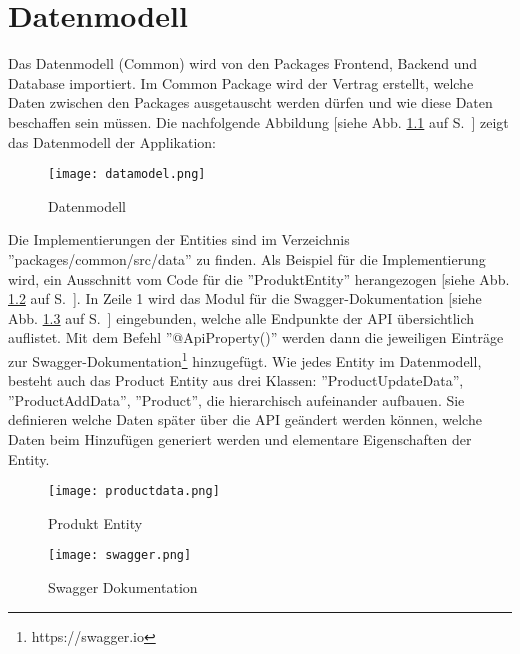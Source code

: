 \chapter{Datenmodell}
Das Datenmodell (Common) wird von den Packages Frontend, Backend und Database importiert. Im Common Package wird der Vertrag erstellt, welche Daten zwischen den Packages ausgetauscht werden dürfen und wie diese Daten beschaffen sein müssen.
Die nachfolgende Abbildung [siehe Abb. \ref{fig: datamodel} auf S.~\pageref{fig: datamodel}] zeigt das Datenmodell der Applikation:
\begin{figure}[h]
    \centering
    \texttt{[image: datamodel.png]}
    \caption{Datenmodell}
    \label{fig: datamodel}
\end{figure}

Die Implementierungen der Entities sind im Verzeichnis ''packages/common/src/data'' zu finden. Als Beispiel für die Implementierung wird, ein Ausschnitt vom Code für die ''ProduktEntity'' herangezogen [siehe Abb. \ref{fig: productdata} auf S.~\pageref{fig: productdata}]. In Zeile 1 wird das Modul für die Swagger-Dokumentation [siehe Abb. \ref{fig: swagger} auf S.~\pageref{fig: swagger}] eingebunden, welche alle Endpunkte der API übersichtlich auflistet. Mit dem Befehl ''@ApiProperty()'' werden dann die jeweiligen Einträge zur Swagger-Dokumentation\footnote{https://swagger.io}  hinzugefügt. Wie jedes Entity im Datenmodell, besteht auch das Product Entity aus drei Klassen: ''ProductUpdateData'', ''ProductAddData'', ''Product'', die hierarchisch aufeinander aufbauen. Sie definieren welche Daten später über die API geändert werden können, welche Daten beim Hinzufügen generiert werden und elementare Eigenschaften der Entity. 

\begin{figure}[h]
    \centering
    \texttt{[image: productdata.png]}
    \caption{Produkt Entity}
    \label{fig: productdata}
\end{figure}

\begin{figure}[h]
    \centering
    \texttt{[image: swagger.png]}
    \caption{Swagger Dokumentation}
    \label{fig: swagger}
\end{figure}